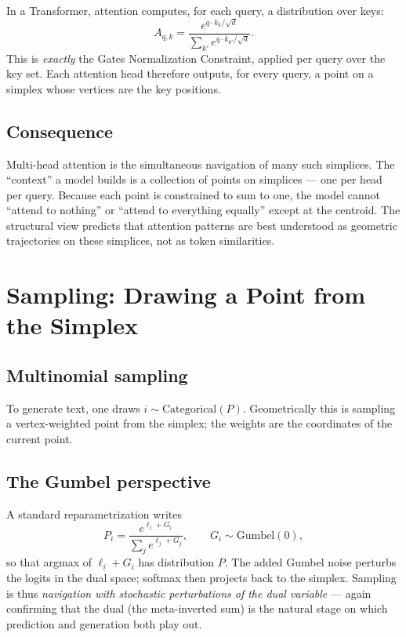 \documentclass[11pt]{article}
\begin{document}
In a Transformer, attention computes, for each query, a distribution over keys:
\[
A_{q,k} = \frac{e^{q\cdot k_k/\sqrt{d}}}{\sum_{k'} e^{q\cdot k_{k'}/\sqrt{d}}}.
\]
This is \emph{exactly} the Gates Normalization Constraint, applied per query over
the key set. Each attention head therefore outputs, for every query, a point on
a simplex whose vertices are the key positions.

\subsection{Consequence}
\label{sec:att-cons}

Multi-head attention is the simultaneous navigation of many such simplices. The
``context'' a model builds is a collection of points on simplices --- one per
head per query. Because each point is constrained to sum to one, the model
cannot ``attend to nothing'' or ``attend to everything equally'' except at the
centroid. The structural view predicts that attention patterns are best
understood as geometric trajectories on these simplices, not as token
similarities.

\section{Sampling: Drawing a Point from the Simplex}
\label{sec:sampling}

\subsection{Multinomial sampling}
\label{sec:samp-multi}

To generate text, one draws $i\sim\mathrm{Categorical}(P)$. Geometrically this
is sampling a vertex-weighted point from the simplex; the weights are the
coordinates of the current point.

\subsection{The Gumbel perspective}
\label{sec:samp-gumbel}

A standard reparametrization writes
\[
P_i = \frac{e^{\ell_i + G_i}}{\sum_j e^{\ell_j + G_j}},\qquad G_i\sim\mathrm{Gumbel}(0),
\]
so that argmax of $\ell_i+G_i$ has distribution $P$. The added Gumbel noise
perturbs the logits in the dual space; softmax then projects back to the
simplex. Sampling is thus \emph{navigation with stochastic perturbations of the
dual variable} --- again confirming that the dual (the meta-inverted sum) is the
natural stage on which prediction and generation both play out.
\end{document}
